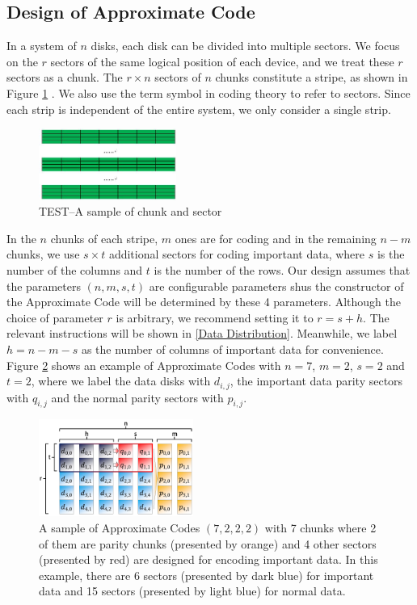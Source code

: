 \documentclass[sigconf]{acmart}
\begin{document}
\subsection{Design of Approximate Code}
In a system of $n$ disks, each disk can be divided into multiple sectors. We focus on the $r$ sectors of the same logical position of each device, and we treat these $r$ sectors as a chunk. The $r \times n$ sectors of $n$ chunks constitute a stripe, as shown in Figure \ref{TEST-chunk-sector} . We also use the term symbol in coding theory to refer to sectors. Since each strip is independent of the entire system, we only consider a single strip.

\begin{figure}[ht]
\centering
\includegraphics[width=0.4\textwidth]{photo/TEST-chunk-sector.JPG}
\caption{TEST--A sample of chunk and sector}
\label{TEST-chunk-sector}
\end{figure}

In the $n$ chunks of each stripe, $m$ ones are for coding and in the remaining $n-m$ chunks, we use $s \times t$ additional sectors for coding important data, where $s$ is the number of the columns and $t$ is the number of the rows.
Our design assumes that the parameters  $(n, m, s,t)$ are configurable parameters shus the constructor of the Approximate Code will be determined by these 4 parameters.
Although the choice of parameter $r$ is arbitrary, we recommend setting it to $r=s+h$.
The relevant instructions will be shown in \ref{Data Distribution}.
Meanwhile, we label $h=n-m-s$ as the number of columns of important data for convenience.
Figure \ref{apcode-7222-v5} shows an example of Approximate Codes with $n = 7$, $m = 2$, $s=2$ and $t = 2$, where we label the data disks with $d_{i,j}$, the important data parity sectors with $q_{i,j}$ and the normal parity sectors with $p_{i,j}$. 

\begin{figure}[ht]
\centering
\includegraphics[width=0.45\textwidth]{photo/apcode-7222-v5.PDF}
\caption{A sample of Approximate Codes $(7,2,2,2)$ with 7 chunks where 2 of them are parity chunks (presented by orange) and 4 other sectors (presented by red) are designed for encoding important data. In this example, there are 6 sectors (presented by dark blue) for important data and 15 sectors (presented by light blue) for normal data.}
\label{apcode-7222-v5}
\end{figure}
\end{document}
